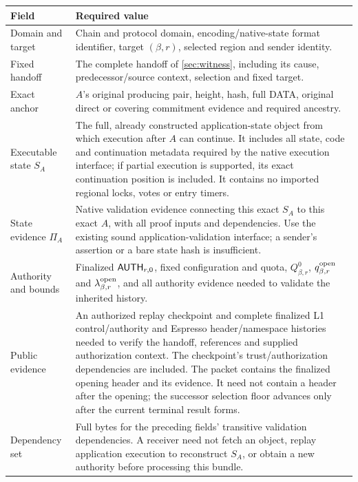 \begin{table}[htbp]\centering\small
\begin{tabularx}{\linewidth}{@{}>{\raggedright\arraybackslash}p{.25\linewidth}Y@{}}\toprule
Field & Required value\\\midrule
Domain and target & Chain and protocol domain, encoding/native-state
format identifier, target $(\beta,r)$, selected region and sender identity.\\
Fixed handoff & The complete handoff of \cref{sec:witness}, including
its cause, predecessor/source context, selection and fixed target.\\
Exact anchor & $A$'s original producing pair, height, hash, full DATA,
original direct or covering commitment evidence and required ancestry.\\
Executable state $S_A$ & The full, already constructed application-state
object from which execution after $A$ can continue. It includes all state,
code and continuation metadata required by the native execution interface;
if partial execution is supported, its exact continuation position is
included. It contains no imported regional locks, votes or entry timers.\\
State evidence $\Pi_A$ & Native validation evidence connecting this exact
$S_A$ to this exact $A$, with all proof inputs and dependencies. Use the
existing sound application-validation interface; a sender's assertion
or a bare state hash is insufficient.\\
Authority and bounds & Finalized $\mathsf{AUTH}_{r,0}$, fixed configuration
and quota, $Q^0_{\beta,r}$, $q^{\rm open}_{\beta,r}$ and
$\lambda^{\rm open}_{\beta,r}$, and all authority evidence needed to
validate the inherited history.\\
Public evidence & An authorized replay checkpoint and complete finalized
L1 control/authority and Espresso header/namespace histories needed to
verify the handoff, references and supplied authorization context. The
checkpoint's trust/authorization dependencies are included. The packet contains the finalized opening header and its evidence.
It need not contain a header after the opening; the successor selection
floor advances only after the current terminal result forms.\\
Dependency set & Full bytes for the preceding fields' transitive
validation dependencies. A receiver need not fetch an object, replay
application execution to reconstruct $S_A$, or obtain a new authority
before processing this bundle.\\\bottomrule
\end{tabularx}
\end{table}

